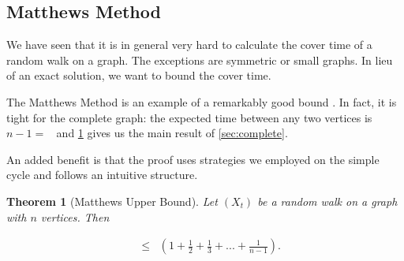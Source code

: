 \documentclass[12pt]{article}
\newtheorem{theorem}{Theorem}
\theoremstyle{definition}
\DeclareMathOperator{\tcov}{t_\textrm{cov}}      %
\DeclareMathOperator{\hit}{t_{\textrm{hit}}}     %
\begin{document}
\subsection{Matthews Method}
We have seen that it is in general very hard
to calculate the cover time of a random walk
on a graph.
The exceptions are symmetric or small graphs.
In lieu of an exact solution, we want to 
bound the cover time.

The Matthews Method is an example of a remarkably good bound \cite{LP17}.
In fact, it is tight for the complete graph:
the expected time between any two vertices
is $n-1 = \hit$ and \cref{thm:matthews_up} gives
us the main result of \cref{sec:complete}.

An added benefit is that the proof uses strategies we employed on the
simple cycle and follows an intuitive structure.

\begin{theorem}[Matthews Upper Bound]
Let $(X_t)$ be a random walk on a graph with $n$ vertices. Then \label{thm:matthews_up}
\end{theorem}
\begin{align}
\tcov &\leq \hit \left(1 + \frac{1}{2} + \frac{1}{3} + ... + \frac{1}{n-1} \right). \nonumber
\end{align}
\end{document}
